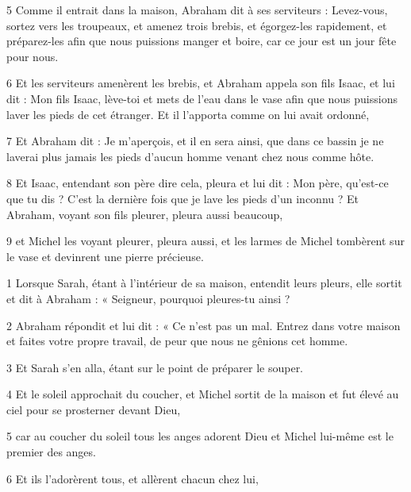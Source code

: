 \par 5 Comme il entrait dans la maison, Abraham dit à ses serviteurs : Levez-vous, sortez vers les troupeaux, et amenez trois brebis, et égorgez-les rapidement, et préparez-les afin que nous puissions manger et boire, car ce jour est un jour fête pour nous.

\par 6 Et les serviteurs amenèrent les brebis, et Abraham appela son fils Isaac, et lui dit : Mon fils Isaac, lève-toi et mets de l'eau dans le vase afin que nous puissions laver les pieds de cet étranger. Et il l'apporta comme on lui avait ordonné,

\par 7 Et Abraham dit : Je m'aperçois, et il en sera ainsi, que dans ce bassin je ne laverai plus jamais les pieds d'aucun homme venant chez nous comme hôte.

\par 8 Et Isaac, entendant son père dire cela, pleura et lui dit : Mon père, qu'est-ce que tu dis ? C'est la dernière fois que je lave les pieds d'un inconnu ? Et Abraham, voyant son fils pleurer, pleura aussi beaucoup,

\par 9 et Michel les voyant pleurer, pleura aussi, et les larmes de Michel tombèrent sur le vase et devinrent une pierre précieuse.


\par 1 Lorsque Sarah, étant à l'intérieur de sa maison, entendit leurs pleurs, elle sortit et dit à Abraham : « Seigneur, pourquoi pleures-tu ainsi ?

\par 2 Abraham répondit et lui dit : « Ce n'est pas un mal. Entrez dans votre maison et faites votre propre travail, de peur que nous ne gênions cet homme.

\par 3 Et Sarah s'en alla, étant sur le point de préparer le souper.

\par 4 Et le soleil approchait du coucher, et Michel sortit de la maison et fut élevé au ciel pour se prosterner devant Dieu,

\par 5 car au coucher du soleil tous les anges adorent Dieu et Michel lui-même est le premier des anges.

\par 6 Et ils l'adorèrent tous, et allèrent chacun chez lui,

